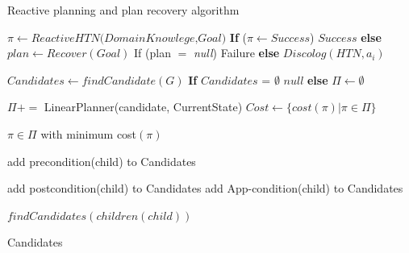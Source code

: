 \documentclass[conference]{IEEEtran}
\begin{document}
	\begin{algorithm}[h]
		\caption{ Reactive planning and plan recovery algorithm}
		\label{pseudoPSO}
		\begin{algorithmic}[]
			\State $\pi \gets Reactive HTN \textit{(DomainKnowlege,Goal)}$
			\State \textbf{If} {($ \pi \gets\textit{Success} $)} 
			\State \Return $\textit{Success} $
			\State \textbf{else} $ plan \gets Recover(Goal)$
			\State If {(plan $=$ \textit{null})}
			\State \Return Failure
			\State \textbf{else} 
			\State  $\textit{Discolog} (HTN,a_i) $
			
			
			\EndProcedure 
			\State
			\State $\textit{Candidates}\gets\textit{findCandidate}{(G)} $
			\State \textbf{If} {$ \textit{Candidates = }\emptyset $} 
			\State \Return $\textit{null} $
			\State \textbf{else}  $\Pi \gets \emptyset$
			
			\State $\Pi += $ LinearPlanner(candidate, CurrentState)
			\State  $Cost \gets \{ cost(\pi) | \pi \in  \Pi \} $
			
			\State \Return $\pi \in \Pi$  with minimum cost$(\pi)$
			
			\EndProcedure
			\State
			\State add precondition(child) to Candidates
			
			\State add postcondition(child) to Candidates	
			\State add App-condition(child) to Candidates
			
			\State $\textit{findCandidates} (children(child))$
			
			\State\Return Candidates
			
			\EndProcedure 
		\end{algorithmic}
	\end{algorithm}
\end{document}
